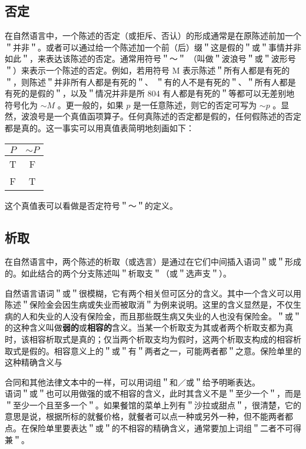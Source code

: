 \subsection{否定}
在自然语言中，一个陈述的否定（或拒斥、否认）的形成通常是在原陈述前加一个＂并非＂。或者可以通过给一个陈述加一个前（后）缀＂这是假的＂或＂事情并非如此＂，来表达该陈述的否定。通常用符号＂～＂ （叫做＂波浪号＂或＂波形号＂）来表示一个陈述的否定。例如，若用符号 M 表示陈述＂所有人都是有死的＂，则陈述＂并非所有人都是有死的＂、 ＂有的人不是有死的＂、＂所有人都是有死的是假的＂，以及＂情况并非是所 804 有人都是有死的＂等都可以无差别地符号化为 $\sim M$ 。更一般的，如果 $p$ 是一任意陈述，则它的否定可写为 $\sim p$ 。显然，波浪号是一个真值函项算子。任何真陈述的否定都是假的，任何假陈述的否定都是真的。这一事实可以用真值表简明地刻画如下：

\begin{center}
\begin{tabular}{|cc|}
\hline
$P$ & $\sim P$ \\
\hline
T & F \\
F & T \\
\hline
\end{tabular}
\end{center}

这个真值表可以看做是否定符号＂～＂的定义。

\subsection{析取}
在自然语言中，两个陈述的析取（或选言）是通过在它们中间插入语词＂或＂形成的。如此结合的两个分支陈述叫＂析取支＂（或＂选声支＂）。

自然语言语词＂或＂很模糊，它有两个相关但可区分的含义。其中一个含义可以用陈述＂保险金会因生病或失业而被取消＂为例来说明。这里的含义显然是，不仅生病的人和失业的人没有保险金，而且那些既生病又失业的人也没有保险金。＂或＂的这种含义叫做\textbf{弱的}或\textbf{相容的}含义。当某一个析取支为其或者两个析取支都为真时，该相容析取式是真的；仅当两个析取支均为假时，这两个析取支构成的相容析取式是假的。相容意义上的＂或＂有＂两者之一，可能两者都＂之意。保险单里的这种精确含义与

合同和其他法律文本中的一样，可以用词组＂和／或＂给予明晰表达。\\
语词＂或＂也可以用做强的或不相容的含义，此时其含义不是＂至少一个＂，而是＂至少一个且至多一个＂。如果餐馆的菜单上列有＂沙拉或甜点＂，很清楚，它的意思是说，根据所标的就餐价格，就餐者可以点一种或另外一种，但不能两者都点。在保险单里要表达＂或＂的不相容的精确含义，通常要加上词组＂二者不可得兼＂。

